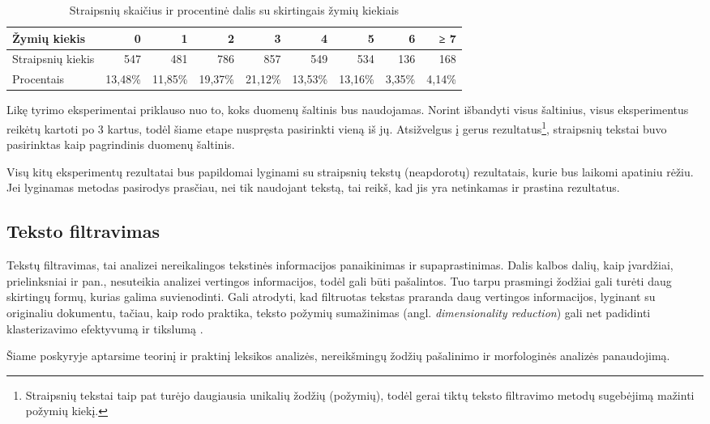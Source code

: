 \documentclass{VUMIFInfBakalaurinis}
\begin{document}
\begin{table}[H]
  \centering
  \caption{Straipsnių skaičius ir procentinė dalis su skirtingais žymių kiekiais}
  \begin{tabular}{|l|r|r|r|r|r|r|r|r|}
  \hline
  Žymių kiekis & 0       & 1       & 2       & 3       & 4       & 5       & 6      & ≥ 7    \\ \hline
  Straipsnių kiekis   & 547     & 481     & 786     & 857     & 549     & 534     & 136    & 168    \\ \hline
  Procentais   & 13,48\% & 11,85\% & 19,37\% & 21,12\% & 13,53\% & 13,16\% & 3,35\% & 4,14\% \\ \hline
  \end{tabular}
  \end{table}

Likę tyrimo eksperimentai priklauso nuo to, koks duomenų šaltinis bus
naudojamas. Norint išbandyti visus šaltinius, visus eksperimentus
reikėtų kartoti po 3 kartus, todėl šiame etape nuspręsta pasirinkti
vieną iš jų. Atsižvelgus į gerus rezultatus\footnote{Straipsnių tekstai
  taip pat turėjo daugiausia unikalių žodžių (požymių), todėl gerai
  tiktų teksto filtravimo metodų sugebėjimą mažinti požymių kiekį.},
straipsnių tekstai buvo pasirinktas kaip pagrindinis duomenų šaltinis.

Visų kitų eksperimentų rezultatai bus papildomai lyginami su straipsnių
tekstų (neapdorotų) rezultatais, kurie bus laikomi apatiniu rėžiu. Jei
lyginamas metodas pasirodys prasčiau, nei tik naudojant tekstą, tai
reikš, kad jis yra netinkamas ir prastina rezultatus.

\subsection{Teksto filtravimas}

Tekstų filtravimas, tai analizei nereikalingos tekstinės informacijos
panaikinimas ir supaprastinimas. Dalis kalbos dalių, kaip
įvardžiai, prielinksniai ir pan., nesuteikia analizei vertingos
informacijos, todėl gali būti pašalintos. Tuo tarpu prasmingi žodžiai
gali turėti daug skirtingų formų, kurias galima suvienodinti. Gali
atrodyti, kad filtruotas tekstas praranda daug vertingos informacijos,
lyginant su originaliu dokumentu, tačiau, kaip rodo praktika, teksto
požymių sumažinimas (angl. \emph{dimensionality reduction}) gali net
padidinti klasterizavimo efektyvumą ir tikslumą \cite{mugunthadevi2011survey}.

Šiame poskyryje aptarsime teorinį ir praktinį leksikos analizės,
nereikšmingų žodžių pašalinimo ir morfologinės analizės panaudojimą.
\end{document}
